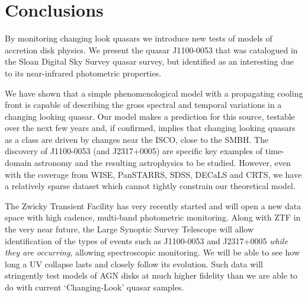 \documentclass[a4paper,fleqn,usenatbib]{mnras}
\begin{document}
\section{Conclusions} 
By monitoring changing look quasars we introduce new
tests of models of accretion disk physics. We present the 
quasar J1100-0053 that was catalogued in the Sloan Digital 
Sky Survey quasar survey, but identified as an interesting due 
to its near-infrared photometric properties. 

We have shown that a simple
phenomenological model with a propagating cooling front is capable of
describing the gross spectral and temporal variations in a changing
looking quasar. Our model makes a prediction for this source, testable
over the next few years and, if confirmed, implies that changing
looking quasars as a class are driven by changes near the ISCO, close
to the SMBH. The discovery of J1100-0053 (and J2317+0005) are specific
key examples of time-domain astronomy and the resulting astrophysics
to be studied. However, even with the coverage from WISE, PanSTARRS,
SDSS, DECaLS and CRTS, we have a relatively sparse dataset which
cannot tightly constrain our theoretical model. 

The Zwicky Transient
Facility \citep[ZTF; ][]{Bellm2014} has very recently started and will
open a new data space with high cadence, multi-band photometric
monitoring. Along with ZTF in the very near future, the Large Synoptic
Survey Telescope \citep{Ivezic2008, LSST_ScienceBookV2} will allow
identification of the types of events such as J1100-0053 and
J2317+0005 \emph{while they are occurring}, allowing spectroscopic
monitoring. We will be able to see how long a UV collapse lasts and
closely follow its evolution.  Such data will stringently test models
of AGN disks at much higher fidelity than we are able to do with
current `Changing-Look' quasar samples.

\smallskip
\smallskip

\end{document}
